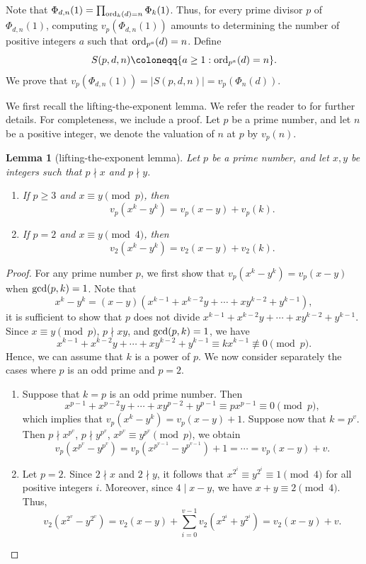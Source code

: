 \documentclass[10pt,leqno]{amsart}
\newtheorem{lemma}[theorem]{Lemma}
\theoremstyle{definition}
\theoremstyle{remark}
\numberwithin{equation}{section}
\def\gcd{{\rm gcd}}
\def\ord{{\rm ord}}
\begin{document}
Note that $\Phi_{d,n}(1) = \prod_{\ord_k(d) = n}\Phi_k(1)$. Thus, for every prime divisor $p$ of $\Phi_{d,n}(1)$, computing $v_p(\Phi_{d,n}(1))$ amounts to determining the number of positive integers $a$ such that $\ord_{p^a}(d) = n$. Define
$$S(p,d,n)\coloneqq\{a\geq 1:\ord_{p^a}(d) = n\}.$$
We prove that $v_p(\Phi_{d,n}(1)) = |S(p,d,n)| = v_p(\Phi_n(d))$.

We first recall the lifting-the-exponent lemma. We refer the reader to \cite{Par11} for further details. For completeness, we include a proof. Let $p$ be a prime number, and let $n$ be a positive integer, we denote the valuation of $n$ at $p$ by $v_p(n)$.

\begin{lemma}[lifting-the-exponent lemma]
    Let $p$ be a prime number, and let $x,y$ be integers such that $p\nmid x$ and $p\nmid y$.
    \begin{enumerate}
        \item If $p\geq 3$ and $x\equiv y\pmod p$, then
        $$v_p(x^k-y^k) = v_p(x-y)+v_p(k).$$
        \item If $p = 2$ and $x\equiv y\pmod 4$, then 
        $$v_2(x^k-y^k) = v_2(x-y)+v_2(k).$$
    \end{enumerate}
\end{lemma}

\begin{proof}
    For any prime number $p$, we first show that $v_p(x^k-y^k) = v_p(x-y)$ when $\gcd(p,k) = 1$. Note that
    $$x^k-y^k = (x-y)(x^{k-1}+x^{k-2}y+\cdots+xy^{k-2}+y^{k-1}),$$
    it is sufficient to show that $p$ does not divide $x^{k-1}+x^{k-2}y+\cdots+xy^{k-2}+y^{k-1}$. Since $x\equiv y\pmod p$, $p\nmid xy$, and $\gcd(p,k) = 1$, we have
    $$x^{k-1}+x^{k-2}y+\cdots+xy^{k-2}+y^{k-1}\equiv kx^{k-1}\not\equiv 0\pmod p.$$
    Hence, we can assume that $k$ is a power of $p$. We now consider separately the cases where $p$ is an odd prime and $p = 2$.
    \begin{enumerate}
        \item Suppose that $k = p$ is an odd prime number. Then 
        $$x^{p-1}+x^{p-2}y+\cdots+xy^{p-2}+y^{p-1}\equiv px^{p-1}\equiv 0\pmod p,$$
        which implies that $v_p(x^k-y^k) = v_p(x-y)+1$. Suppose now that $k = p^v$. Then $p\nmid x^{p^v}$, $p\nmid y^{p^v}$, $x^{p^v}\equiv y^{p^v}\pmod p$, we obtain
        $$v_p(x^{p^v}-y^{p^v}) = v_p(x^{p^{v-1}}-y^{p^{v-1}})+1 = \cdots = v_p(x-y)+v.$$
        \item Let $p = 2$. Since $2\nmid x$ and $2\nmid y$, it follows that $x^{2^i}\equiv y^{2^i}\equiv 1\pmod 4$ for all positive integers $i$. Moreover, since $4\mid x-y$, we have $x+y\equiv 2\pmod 4$. Thus, 
        $$v_2(x^{2^v}-y^{2^v}) = v_2(x-y)+\sum_{i = 0}^{v-1} v_2(x^{2^{i}}+y^{2^i}) =  v_2(x-y)+v.$$
    \end{enumerate}
\end{proof}
\end{document}
